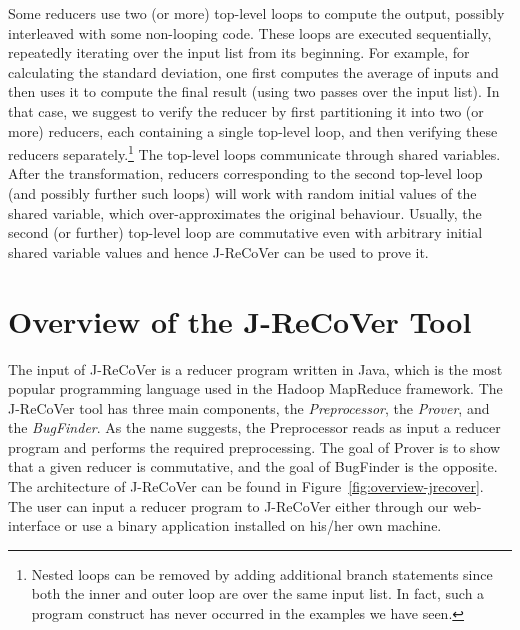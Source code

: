 \documentclass{llncs}
\begin{document}
Some reducers use two (or more) top-level loops to compute the output, possibly
interleaved with some non-looping code. These loops are executed sequentially,
repeatedly iterating over the input list from its beginning. For example, for
calculating the standard deviation, one first computes the average of inputs and
then uses it to compute the final result (using two passes over the input list).
In that case, we suggest to verify the reducer by first partitioning it into two
(or more) reducers, each containing a single top-level loop, and then verifying
these reducers separately.\footnote{Nested loops can be removed by adding
additional branch statements since both the inner and outer loop are over the
same input list. In fact, such a program construct has never occurred in the
examples we have seen.} The top-level loops communicate through shared
variables. After the transformation, reducers corresponding to the second
top-level loop (and possibly further such loops) will work with random initial
values of the shared variable, which over-approximates the original behaviour.
Usually, the second (or further) top-level loop are commutative even with
arbitrary initial shared variable values and hence J-ReCoVer can be used to
prove it.


\vspace*{-2mm}
\section{Overview of the J-ReCoVer Tool} \label{sec:overview}
\vspace*{-1mm}


The input of J-ReCoVer is a reducer program written in Java, which is the most
popular programming language used in the Hadoop MapReduce
framework. The J-ReCoVer tool has three main components, the
\emph{Preprocessor}, the \emph{Prover}, and the \emph{BugFinder}. As the name
suggests, the Preprocessor reads as input a reducer program and performs the
required preprocessing. The goal of Prover is to show that a given reducer is
commutative, and the goal of BugFinder is the opposite. The architecture of
J-ReCoVer can be found in Figure~\ref{fig:overview-jrecover}. The user can input
a reducer program to J-ReCoVer either through our web-interface or use a binary
application installed on his/her own machine.
\end{document}
